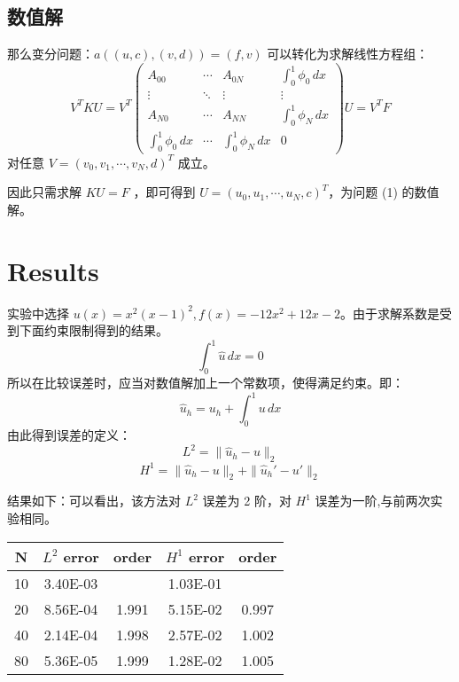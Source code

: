 \documentclass[11pt]{ctexart}
\begin{document}
\subsection{数值解}
那么变分问题：$ a((u,c),(v,d)) = (f,v) $ 可以转化为求解线性方程组：
\begin{equation}
  V^TKU = V^T\begin{pmatrix}
    A_{00}&\cdots&A_{0N}& \int_0^1 \phi_0 \,dx \\
    \vdots&\ddots&\vdots&\vdots \\
    A_{N0}&\cdots&A_{NN}& \int_0^1 \phi_N \,dx\\
    \int_0^1 \phi_0 \,dx&\cdots&\int_0^1 \phi_N \,dx&0
  \end{pmatrix}U = V^TF
\end{equation}
对任意 $ V=(v_0,v_1,\cdots,v_{N},d)^T $ 成立。

因此只需求解 $ KU = F $ ，即可得到 $ U= (u_0,u_1,\cdots,u_{N},c)^T $，为问题 (1) 的数值解。


\section{Results}
实验中选择 $u(x) = x^2(x-1)^2, f(x) = -12x^2+12x-2$。由于求解系数是受到下面约束限制得到的结果。
\begin{equation}
  \int_0^1 \hat{u} \,dx = 0
\end{equation}
所以在比较误差时，应当对数值解加上一个常数项，使得满足约束。即：
\begin{equation}
  \hat{u}_h = u_h + \int_0^1 u \,dx
\end{equation}
由此得到误差的定义：
\begin{equation}
  L^2 = \|\hat{u}_h - u\|_2
\end{equation}
\begin{equation}
  H^1 = \|\hat{u}_h - u\|_2 + \|\hat{u}_h' - u'\|_2
\end{equation}

结果如下：可以看出，该方法对 $ L^2 $ 误差为 2 阶，对 $ H^1 $ 误差为一阶,与前两次实验相同。
\begin{table}[htbp]
  \centering
  \begin{tabular}{|c|cc|cc|}
 \toprule
 N     & \multicolumn{1}{c}{$L^2$ error} & \multicolumn{1}{c|}{order} & \multicolumn{1}{c}{$H^1$ error} & \multicolumn{1}{c|}{order} \\
    \midrule
    10    & 3.40E-03 &       & 1.03E-01 &       \\
    20    & 8.56E-04 & 1.991 & 5.15E-02 & 0.997 \\
    40    & 2.14E-04 & 1.998 & 2.57E-02 & 1.002 \\
    80    & 5.36E-05 & 1.999 & 1.28E-02 & 1.005 \\  
    \bottomrule
    \end{tabular}%
    \label{tab:error}%
\end{table}%
\end{document}
